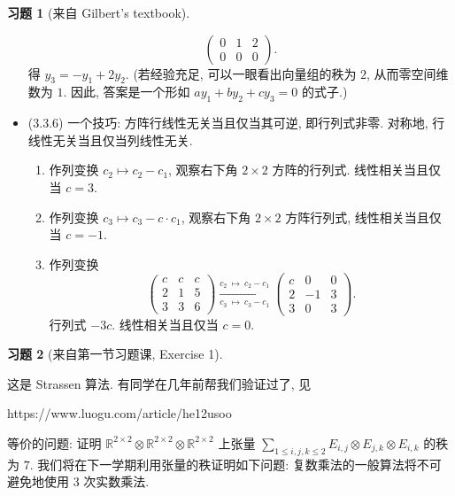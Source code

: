 \documentclass[11pt]{ctexart}
\theoremstyle{definition}
\numberwithin{equation}{section}
\theoremstyle{definition}
\newtheorem*{exercise}{习题}
\theoremstyle{remark}
\begin{document}
\begin{exercise}[来自 Gilbert's textbook]
\begin{aaa}
\begin{itemize}
\begin{equation}
\begin{pmatrix}
            0 & 1 & 2\\
            0 & 0 & 0
            \end{pmatrix}.
    \end{equation}
    得 $y_3=-y_1+2y_2$. (若经验充足, 可以一眼看出向量组的秩为 $2$, 从而零空间维数为 $1$. 因此, 答案是一个形如 $ay_1+by_2+cy_3=0$ 的式子.)
    \item (3.3.6) 一个技巧: 方阵行线性无关当且仅当其可逆, 即行列式非零. 对称地, 行线性无关当且仅当列线性无关. 
    \begin{enumerate}
        \item 作列变换 $c_2\mapsto c_2-c_1$, 观察右下角 $2\times 2$ 方阵的行列式. 线性相关当且仅当 $c=3$.
        \item 作列变换 $c_3\mapsto c_3-c\cdot c_1$, 观察右下角 $2\times 2$ 方阵行列式, 线性相关当且仅当 $c=-1$. 
        \item 作列变换
        \begin{equation}
            \begin{pmatrix}
                c & c & c\\
                2 & 1 & 5\\
                3 & 3 & 6
                \end{pmatrix}\xrightarrow[c_{3} \ \mapsto \ c_{3} -c_{1}]{c_{2} \ \mapsto \ c_{2} -c_{1}}\begin{pmatrix}
                c & 0 & 0\\
                2 & -1 & 3\\
                3 & 0 & 3
                \end{pmatrix}.
        \end{equation}
        行列式 $-3c$. 线性相关当且仅当 $c=0$. 
    \end{enumerate}
\end{itemize}
\end{aaa}
\end{exercise}

\begin{exercise}[来自第一节习题课, Exercise 1]
    \begin{aaa}
    这是 Strassen 算法. 有同学在几年前帮我们验证过了, 见
    \begin{llll}
        https://www.luogu.com/article/he12usoo
    \end{llll} 

    等价的问题: 证明 $\mathbb R^{2\times 2}\otimes \mathbb R^{2\times 2}\otimes \mathbb R^{2\times 2}$ 上张量 $\sum_{1\leq i,j,k\leq 2}E_{i,j}\otimes E_{j,k}\otimes E_{i,k}$ 的秩为 $7$. 我们将在下一学期利用张量的秩证明如下问题: 复数乘法的一般算法将不可避免地使用 $3$ 次实数乘法. 
\end{aaa}
\end{exercise}
\end{document}
